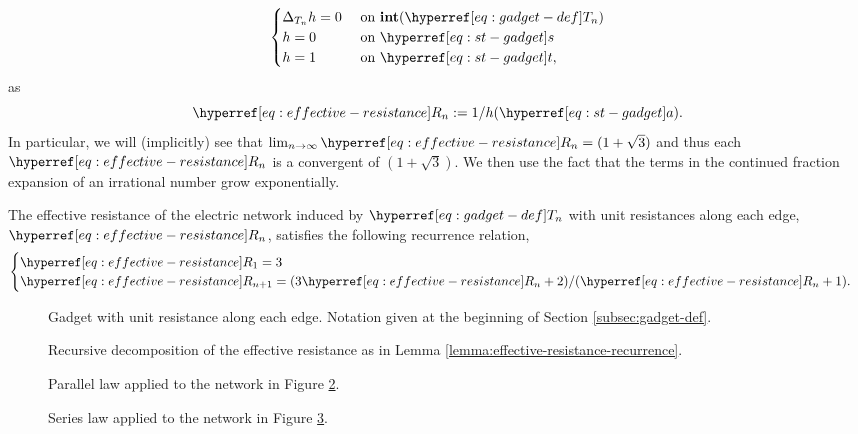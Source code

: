 \documentclass[12pt]{amsart}
\numberwithin{equation}{section}
\begin{document}
	\begin{equation} \label{eq:escape-probability}
		\begin{cases}
			\Delta_{{T_{n}}} h = 0 &\mbox{ on $\inte(\Tn{n})$}  \\
			h = 0 &\mbox{ on $\sgadget$} \\
			h = 1 &\mbox{ on $\tgadget$},
		\end{cases}
	\end{equation}
	as
	\begin{equation} \label{eq:effective-resistance}
		\Rn{n} := 1/h(\agadget).
	\end{equation}
	In particular, we will (implicitly) see that $\lim_{n \to \infty} \Rn{n} = (1 + \sqrt{3})$ and thus
	each  $\Rn{n}$ is a convergent of $(1 + \sqrt{3})$. We then use the fact that the terms in the continued fraction expansion of an irrational number grow exponentially. 
	
	\begin{lemma} \label{lemma:effective-resistance-recurrence}
		The effective resistance of the electric network induced by $\Tn{n}$ with unit 
		resistances along each edge, $\Rn{n}$, satisfies the following recurrence relation, 
		\begin{equation} \label{eq:effective-resistance-recurrence}
			\begin{cases}
				\Rn{1} = 3 \\
				\Rn{n+1} = (3 \Rn{n} + 2)/(\Rn{n} + 1).
			\end{cases}
		\end{equation}
	\end{lemma}
	\begin{figure}
		\begin{center}
			  
		\end{center} \caption{Gadget with unit resistance along each edge. Notation given at the beginning of Section \ref{subsec:gadget-def}. }\label{fig:elec1}
	\end{figure}
	\begin{figure}
		\begin{center}
			  
		\end{center}
		\caption{Recursive decomposition of the effective resistance as in Lemma \ref{lemma:effective-resistance-recurrence}.} \label{fig:elec2}
	\end{figure}
	\begin{figure}
		\begin{center}
			  
		\end{center}
		\caption{Parallel law applied to the network in Figure \ref{fig:elec2}.}\label{fig:elec3}
	\end{figure}
	\begin{figure}
		\begin{center}
			  
		\end{center}
		\caption{Series law applied to the network in Figure \ref{fig:elec3}.}\label{fig:elec4}
	\end{figure}
	
\end{document}
